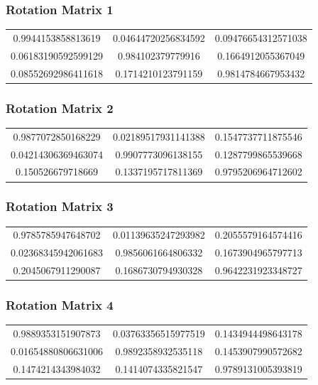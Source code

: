 \documentclass[12pt]{article}
\begin{document}
\subsubsection{Rotation Matrix 1}
\begin{tabular}{|c|c|c|}
\hline
  
 0.9944153858813619 &  0.04644720256834592 &  0.09476654312571038 \\ 
  0.06183190592599129 &  0.984102379779916 &  0.1664912055367049 \\ 
  0.08552692986411618 &  0.1714210123791159 &  0.9814784667953432
\\ 
\hline
\end{tabular}
\subsubsection{Rotation Matrix 2}
\begin{tabular}{|c|c|c|}
\hline

  
 0.9877072850168229 &  0.02189517931141388 &  0.1547737711875546 \\ 
  0.04214306369463074 &  0.9907773096138155 &  0.1287799865539668 \\ 
  0.150526679718669 &  0.1337195717811369 &  0.9795206964712602
\\ 
\hline
\end{tabular}
\subsubsection{Rotation Matrix 3}
\begin{tabular}{|c|c|c|}
\hline

  
 0.9785785947648702 &  0.01139635247293982 &  0.2055579164574416 \\ 
  0.02368345942061683 &  0.9856061664806332 &  0.1673904965797713 \\ 
  0.2045067911290087 &  0.1686730794930328 &  0.9642231923348727
\\ 
\hline
\end{tabular}
\subsubsection{Rotation Matrix 4}
\begin{tabular}{|c|c|c|}
\hline

  
 0.9889353151907873 &  0.03763356515977519 &  0.1434944498643178 \\ 
  0.01654880806631006 &  0.9892358932535118 &  0.1453907990572682 \\ 
  0.1474214343984032 &  0.1414074335821547 &  0.9789131005393819
\\ 
\hline
\end{tabular}
\end{document}

